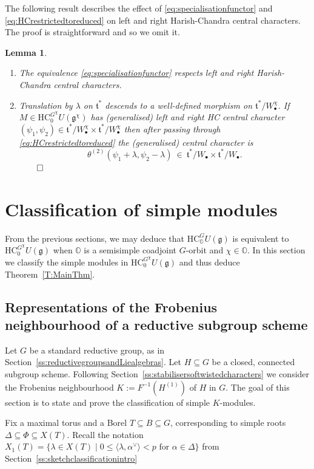 \documentclass[twoside,12pt,reqno]{amsart}
\newtheorem{Lemma}[Theorem]{Lemma}
\theoremstyle{remark}
\numberwithin{equation}{section}
\def\O{{\mathbb O}}
\def\HC{\mathrm{HC}}
\def\g{{\mathfrak g}}
\def\t{\mathfrak t}
\begin{document}
The following result describes the effect of \eqref{eq:specialisationfunctor} and \eqref{eq:HCrestrictedtoreduced} on left and right Harish-Chandra central characters. The proof is straightforward and so we omit it.
\begin{Lemma} \
\label{L:cclemma}
    \begin{enumerate}
        \item The equivalence \eqref{eq:specialisationfunctor} respects left and right Harish-Chandra central characters.
        \item Translation by $\lambda$ on $\t^*$ descends to a well-defined morphism on $\t^* / W_\bullet^\chi$. If $M \in \HC_0^{G^\chi} U(\g^\chi)$ has (generalised) left and right HC central character
        $(\psi_1, \psi_2) \in \t^* / W^\chi_\bullet \times \t^* / W^\chi_\bullet$
        then after passing through \eqref{eq:HCrestrictedtoreduced} the (generalised) central character is
        $$\theta^{(2)}(\psi_1 + \lambda , \psi_2 - \lambda)  \ \in \ \t^* / W_\bullet \times \t^* / W_\bullet.$$
        $\hfill \qed$
    \end{enumerate}
\end{Lemma}



\section{Classification of simple modules}

From the previous sections, we may deduce that $\HC_\O^G U(\g)$ is equivalent to $\HC_0^{G^\chi} U(\g)$ when $\O$ is a semisimple coadjoint $G$-orbit and $\chi\in\O$. In this section we classify the simple modules   in $\HC_0^{G^\chi} U(\g)$ and thus deduce Theorem~\ref{T:MainThm}.

\subsection{Representations of the Frobenius neighbourhood of a reductive subgroup scheme}

Let $G$ be a standard reductive group, as in Section~\ref{ss:reductivegroupsandLiealgebras}. Let $H \subseteq G$ be a closed, connected subgroup scheme. Following Section~\ref{ss:stabilisersoftwistedcharacters} we consider the Frobenius neighbourhood $K := F^{-1}(H^{(1)})$ of $H$ in $G$. The goal of this section is to state and prove the classification of simple $K$-modules.

Fix a maximal torus and a Borel $T\subseteq B \subseteq G$, corresponding to simple roots $\Delta \subseteq \Phi \subseteq X(T)$. Recall the notation $X_1(T) = \{\lambda \in X(T) \mid 0 \le \langle \lambda ,\alpha^\vee\rangle < p \text{ for } \alpha \in \Delta\}$ from Section~\ref{ss:sketchclassificationintro}
\end{document}
